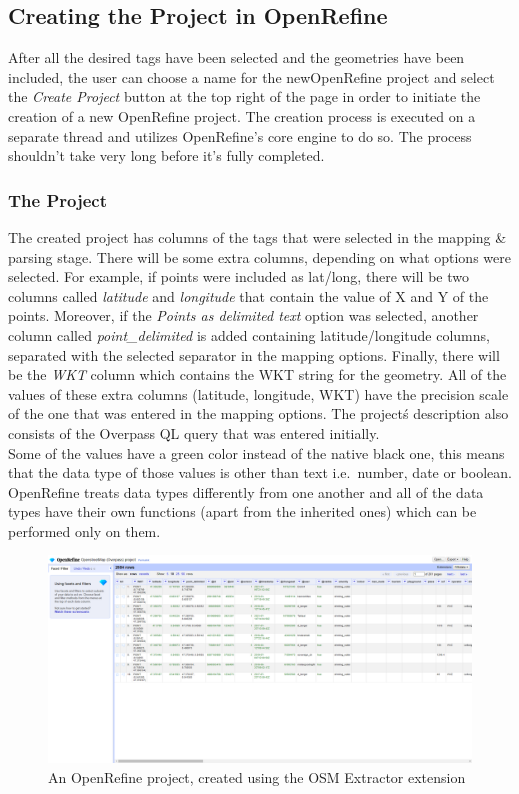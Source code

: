 \subsection{Creating the Project in OpenRefine}
After all the desired tags have been selected and the geometries have been included, the user can choose a
name for the newOpenRefine project and select the \textit{Create Project} button at the top right of the
page in order to initiate the creation of a new OpenRefine project.
The creation process is executed on a separate thread and utilizes OpenRefine's core engine to do so.
The process shouldn't take very long before it's fully completed.
\subsubsection{The Project}
The created project has columns of the tags that were selected in the mapping \& parsing stage. There will be some extra columns,
depending on what options were selected. For example, if points were included as lat/long, there will be two columns called \textit{latitude}
and \textit{longitude} that contain the value of X and Y of the points. Moreover, if the \textit{Points as delimited text} option was selected,
another column called \textit{point\_delimited} is added containing latitude/longitude columns, separated with
the selected separator in the mapping options. Finally, there will be the \textit{WKT} column which contains
the WKT string for the geometry. All of the values of these extra columns (latitude, longitude, WKT) have the precision scale of the one that was entered in
the mapping options. The project\'s description also consists of the Overpass QL query that was entered initially.\\
\newline
Some of the values have a green color instead of the native black one, this means that the data type of those values is other
than text i.e.\ number, date or boolean.
OpenRefine treats data types differently from one another and all of the data types
have their own functions (apart from the inherited ones) which can be performed
only on them.\\
\begin{figure}[H]
    \includegraphics[width=\linewidth]{./Figures/OSM_Extractor/osm_extractor_project.png}
    \caption{An OpenRefine project, created using the OSM Extractor extension}
\end{figure}
